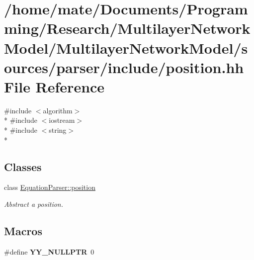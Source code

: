 \hypertarget{position_8hh}{}\section{/home/mate/\+Documents/\+Programming/\+Research/\+Multilayer\+Network\+Model/\+Multilayer\+Network\+Model/sources/parser/include/position.hh File Reference}
\label{position_8hh}
{\ttfamily \#include $<$algorithm$>$}\\*
{\ttfamily \#include $<$iostream$>$}\\*
{\ttfamily \#include $<$string$>$}\\*
\subsection*{Classes}
\begin{DoxyCompactItemize}
\item 
class \hyperlink{classEquationParser_1_1position}{Equation\+Parser\+::position}
\begin{DoxyCompactList}\small\item\em Abstract a position. \end{DoxyCompactList}\end{DoxyCompactItemize}
\subsection*{Macros}
\begin{DoxyCompactItemize}
\item 
\#define {\bfseries Y\+Y\+\_\+\+N\+U\+L\+L\+P\+TR}~0\hypertarget{position_8hh_a5a6c82f7ce4ad9cc8c6c08b7a2de5b84}{}\label{position_8hh_a5a6c82f7ce4ad9cc8c6c08b7a2de5b84}

\end{DoxyCompactItemize}
